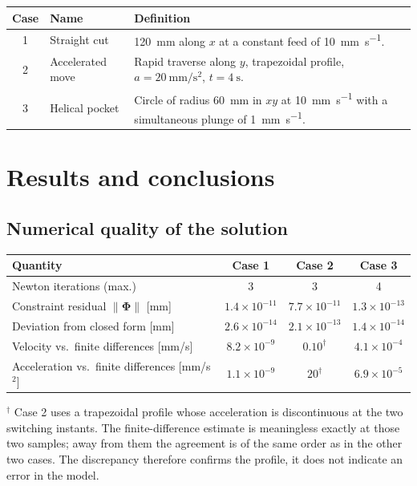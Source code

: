 \documentclass[11pt]{article}
\begin{document}
\begin{center}
\begin{tabular}{@{}cl>{\raggedright\arraybackslash}p{7.6cm}@{}}
\toprule
\textbf{Case} & \textbf{Name} & \textbf{Definition} \\
\midrule
1 & Straight cut      & \SI{120}{\milli\metre} along $x$ at a constant feed of \SI{10}{\milli\metre\per\second}. \\
2 & Accelerated move  & Rapid traverse along $y$, trapezoidal profile, $a=\SI{20}{\milli\metre\per\second\squared}$, $t=\SI{4}{\second}$. \\
3 & Helical pocket    & Circle of radius \SI{60}{\milli\metre} in $xy$ at \SI{10}{\milli\metre\per\second} with a simultaneous plunge of \SI{1}{\milli\metre\per\second}. \\
\bottomrule
\end{tabular}
\end{center}

\section{Results and conclusions}\label{sec:kin-res}

\subsection{Numerical quality of the solution}

\begin{center}
\begin{tabular}{@{}lccc@{}}
\toprule
\textbf{Quantity} & \textbf{Case 1} & \textbf{Case 2} & \textbf{Case 3} \\
\midrule
Newton iterations (max.)                        & 3 & 3 & 4 \\
Constraint residual $\lVert\bm\Phi\rVert$ [mm]  & $1.4\times10^{-11}$ & $7.7\times10^{-11}$ & $1.3\times10^{-13}$ \\
Deviation from closed form [mm]                 & $2.6\times10^{-14}$ & $2.1\times10^{-13}$ & $1.4\times10^{-14}$ \\
Velocity vs.\ finite differences [mm/s]         & $8.2\times10^{-9}$ & $0.10^{\dagger}$ & $4.1\times10^{-4}$ \\
Acceleration vs.\ finite differences [mm/s$^2$] & $1.1\times10^{-9}$ & $20^{\dagger}$ & $6.9\times10^{-5}$ \\
\bottomrule
\end{tabular}
\end{center}
{\footnotesize $^{\dagger}$ Case 2 uses a trapezoidal profile whose acceleration is
discontinuous at the two switching instants. The finite-difference estimate is
meaningless exactly at those two samples; away from them the agreement is of the same
order as in the other two cases. The discrepancy therefore confirms the profile, it does
not indicate an error in the model.}
\end{document}
